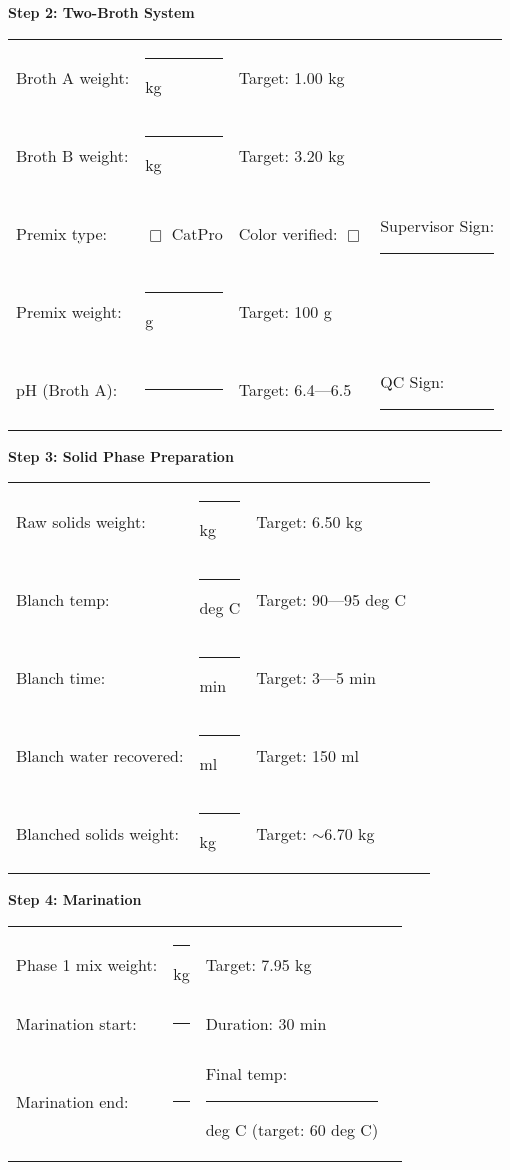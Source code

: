 {\vspace{1em}

\noindent\textbf{Step 2: Two-Broth System}

\begin{tabular}{@{}lp{3cm}p{3cm}p{3cm}@{}}
Broth A weight: & \rule{2.5cm}{0.4pt} kg & Target: 1.00 kg & \\
Broth B weight: & \rule{2.5cm}{0.4pt} 
kg & Target: 3.20 kg & \\
Premix type: & $\Box$ CatPro & Color verified: $\Box$ & Supervisor Sign: \rule{2cm}{0.4pt} \\
Premix weight: & \rule{2.5cm}{0.4pt} g & Target: 100 g & \\
pH (Broth A): & \rule{2.5cm}{0.4pt} & Target: 6.4---6.5 & QC Sign: \rule{2cm}{0.4pt} \\
\end{tabular}

\vspace{1em}

\noindent\textbf{Step 3: Solid Phase Preparation}

\begin{tabular}{@{}lp{3cm}p{3cm}p{3cm}@{}}
Raw solids weight: & \rule{2.5cm}{0.4pt} kg & Target: 6.50 kg & \\
Blanch temp: & \rule{2.5cm}{0.4pt} deg C & Target: 90---95 deg C & \\
Blanch time: & \rule{2.5cm}{0.4pt} min & Target: 3---5 min & \\
Blanch water recovered: & \rule{2.5cm}{0.4pt} ml & Target: 150 ml & \\
Blanched solids weight: & \rule{2.5cm}{0.4pt} kg & Target: $\sim$6.70 kg & 
\\
\end{tabular}

\vspace{1em}

\noindent\textbf{Step 4: Marination}

\begin{tabular}{@{}lp{3cm}p{3cm}p{3cm}@{}}
Phase 1 mix weight: & \rule{2.5cm}{0.4pt} kg & Target: 7.95 kg & \\
Marination start: & \rule{2.5cm}{0.4pt} & Duration: 30 min & \\
Marination end: & \rule{2.5cm}{0.4pt} & Final temp: \rule{2cm}{0.4pt} deg C (target: 60 deg C) & \\
\end{tabular}

\vspace{1em}

}
